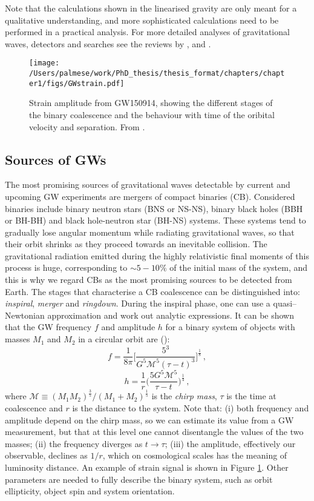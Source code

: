 Note that the calculations shown in the linearised gravity are only meant for a qualitative understanding, and more sophisticated calculations need to be performed in a practical analysis. For more detailed analyses of gravitational waves, detectors and searches see the reviews by \citet{Sathyaprakash}, \citet{pitkin} and \citet{riles}.

\begin{figure}\centering
\texttt{[image: /Users/palmese/work/PhD\_thesis/thesis\_format/chapters/chapter1/figs/GWstrain.pdf]}
\caption{Strain amplitude from GW150914, showing the different stages of the binary coalescence and the behaviour with time of the oribital velocity and separation. From \citet{ligogw150914}.}\label{fig:strain}
\end{figure}

\subsection{Sources of GWs}
The most promising sources of gravitational waves detectable by current and upcoming GW experiments are mergers of compact binaries (CB). Considered binaries include binary neutron stars (BNS or NS-NS), binary black holes (BBH or BH-BH) and black hole-neutron star (BH-NS) systems. These systems tend to gradually lose angular momentum while radiating gravitational waves, so that their orbit shrinks as they proceed towards an inevitable collision. The gravitational radiation emitted during the highly relativistic final moments of this process is huge, corresponding to $\sim 5-10\%$ of the initial mass of the system, and this is why we regard CBs as the most promising sources to be detected from Earth. The stages that characterise a CB coalescence can be distinguished into: \emph{inspiral}, \emph{merger} and \emph{ringdown}. During the inspiral phase, one can use a quasi--Newtonian approximation and work out analytic expressions. It can be shown that the GW frequency $f$ and amplitude $h$ for a binary system of objects with masses $M_1$ and $M_2$ in a circular orbit are (\citealt{riles}):
\begin{equation}
f=\frac{1}{8\pi} \Bigg[ \frac{5^3}{G^5 \mathcal{M}^5(\tau-t)^3}\Bigg]^{\frac{1}{8}} \,,
\end{equation}
\begin{equation}
h=\frac{1}{r}\Bigg( \frac{5 G^5 \mathcal{M}^5}{\tau-t} \Bigg)^\frac{1}{4}\,,\label{eq:h}
\end{equation}
where $\mathcal{M}\equiv (M_1M_2)^\frac{3}{5}/(M_1+M_2)^\frac{1}{5}$ is the \emph{chirp mass},  $\tau$ is the time at coalescence and $r$ is the distance to the system. Note that: (i) both frequency and amplitude depend on the chirp mass, so we can estimate its value from a GW measurement, but that at this level one cannot disentangle the values of the two masses; (ii) the frequency diverges as $t\rightarrow \tau$; (iii) the amplitude, effectively our observable, declines as $1/r$, which on cosmological scales has the meaning of luminosity distance. An example of strain signal is shown in Figure \ref{fig:strain}. Other parameters are needed to fully describe the binary system, such as orbit ellipticity, object spin and system orientation.

